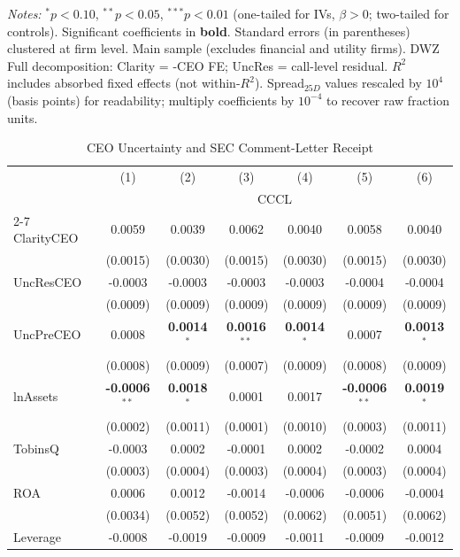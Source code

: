 \documentclass[11pt,a4paper]{article}
\begin{document}
\begin{table}[htbp]
\begin{minipage}{\linewidth}
\vspace{2pt}\scriptsize
\textit{Notes:} $^{*}p<0.10$, $^{**}p<0.05$, $^{***}p<0.01$ (one-tailed for IVs, $\beta > 0$; two-tailed for controls).
 Significant coefficients in \textbf{bold}.
 Standard errors (in parentheses) clustered at firm level.
 Main sample (excludes financial and utility firms). DWZ Full decomposition: Clarity = -CEO FE; UncRes = call-level residual.
 $R^2$ includes absorbed fixed effects (not within-$R^2$).
 Spread$_{25D}$ values rescaled by $10^4$ (basis points) for readability; multiply coefficients by $10^{-4}$ to recover raw fraction units.
\end{minipage}
\end{table}
\clearpage
\begin{table}[htbp]
\centering
\caption{CEO Uncertainty and SEC Comment-Letter Receipt}
\label{tab:h18_ceo2_decomp}
\scriptsize
\begin{tabular}{lcccccc}
\toprule
 & (1) & (2) & (3) & (4) & (5) & (6) \\
 & \multicolumn{6}{c}{CCCL} \\
\cmidrule(lr){2-7}
\midrule
ClarityCEO & 0.0059 & 0.0039 & 0.0062 & 0.0040 & 0.0058 & 0.0040 \\
 & (0.0015) & (0.0030) & (0.0015) & (0.0030) & (0.0015) & (0.0030) \\
UncResCEO & -0.0003 & -0.0003 & -0.0003 & -0.0003 & -0.0004 & -0.0004 \\
 & (0.0009) & (0.0009) & (0.0009) & (0.0009) & (0.0009) & (0.0009) \\
UncPreCEO & 0.0008 & \textbf{0.0014}$^{*}$ & \textbf{0.0016}$^{**}$ & \textbf{0.0014}$^{*}$ & 0.0007 & \textbf{0.0013}$^{*}$ \\
 & (0.0008) & (0.0009) & (0.0007) & (0.0009) & (0.0008) & (0.0009) \\
\midrule
lnAssets & \textbf{-0.0006}$^{**}$ & \textbf{0.0018}$^{*}$ & 0.0001 & 0.0017 & \textbf{-0.0006}$^{**}$ & \textbf{0.0019}$^{*}$ \\
 & (0.0002) & (0.0011) & (0.0001) & (0.0010) & (0.0003) & (0.0011) \\
TobinsQ & -0.0003 & 0.0002 & -0.0001 & 0.0002 & -0.0002 & 0.0004 \\
 & (0.0003) & (0.0004) & (0.0003) & (0.0004) & (0.0003) & (0.0004) \\
ROA & 0.0006 & 0.0012 & -0.0014 & -0.0006 & -0.0006 & -0.0004 \\
 & (0.0034) & (0.0052) & (0.0052) & (0.0062) & (0.0051) & (0.0062) \\
Leverage & -0.0008 & -0.0019 & -0.0009 & -0.0011 & -0.0009 & -0.0012 \\

\end{tabular}
\end{table}
\end{document}
